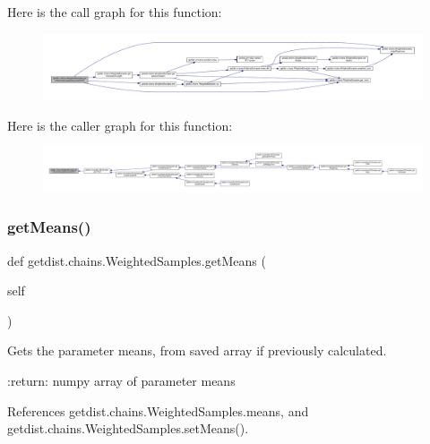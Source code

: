 Here is the call graph for this function\+:
\nopagebreak
\begin{figure}[H]
\begin{center}
\leavevmode
\includegraphics[width=350pt]{classgetdist_1_1chains_1_1WeightedSamples_acc6bb1ecddcbbfa0f9db00442ccc380b_cgraph}
\end{center}
\end{figure}
Here is the caller graph for this function\+:
\nopagebreak
\begin{figure}[H]
\begin{center}
\leavevmode
\includegraphics[width=350pt]{classgetdist_1_1chains_1_1WeightedSamples_acc6bb1ecddcbbfa0f9db00442ccc380b_icgraph}
\end{center}
\end{figure}
\mbox{\label{classgetdist_1_1chains_1_1WeightedSamples_aa5d70ded54742f3296cd856a8a1fa185}} 
\subsubsection{\texorpdfstring{get\+Means()}{getMeans()}}
{\footnotesize\ttfamily def getdist.\+chains.\+Weighted\+Samples.\+get\+Means (\begin{DoxyParamCaption}\item[{}]{self }\end{DoxyParamCaption})}

\begin{DoxyVerb}Gets the parameter means, from saved array if previously calculated.

:return: numpy array of parameter means
\end{DoxyVerb}
 

References getdist.\+chains.\+Weighted\+Samples.\+means, and getdist.\+chains.\+Weighted\+Samples.\+set\+Means().



